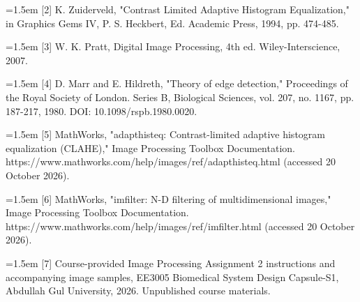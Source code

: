 \documentclass[10pt,a4paper]{article}
\begin{document}
\noindent\hangindent=1.5em [2] K. Zuiderveld, "Contrast Limited Adaptive Histogram Equalization," in Graphics Gems IV, P. S. Heckbert, Ed. Academic Press, 1994, pp. 474-485.\par

\noindent\hangindent=1.5em [3] W. K. Pratt, Digital Image Processing, 4th ed. Wiley-Interscience, 2007.\par

\noindent\hangindent=1.5em [4] D. Marr and E. Hildreth, "Theory of edge detection," Proceedings of the Royal Society of London. Series B, Biological Sciences, vol. 207, no. 1167, pp. 187-217, 1980. DOI: 10.1098/rspb.1980.0020.\par

\noindent\hangindent=1.5em [5] MathWorks, "adapthisteq: Contrast-limited adaptive histogram equalization (CLAHE)," Image Processing Toolbox Documentation. https://www.mathworks.com/help/images/ref/adapthisteq.html (accessed 20 October 2026).\par

\noindent\hangindent=1.5em [6] MathWorks, "imfilter: N-D filtering of multidimensional images," Image Processing Toolbox Documentation. https://www.mathworks.com/help/images/ref/imfilter.html (accessed 20 October 2026).\par

\noindent\hangindent=1.5em [7] Course-provided Image Processing Assignment 2 instructions and accompanying image samples, EE3005 Biomedical System Design Capsule-S1, Abdullah Gul University, 2026. Unpublished course materials.\par
\end{document}
